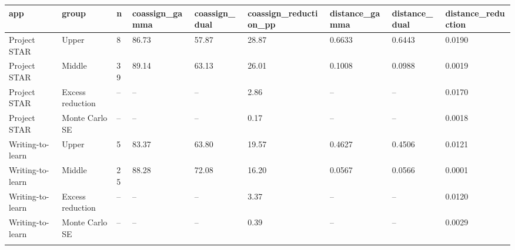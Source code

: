 \begin{longtable}{lllllllll}
\toprule
app & group & n & coassign\_gamma & coassign\_dual & coassign\_reduction\_pp & distance\_gamma & distance\_dual & distance\_reduction \\
\midrule\endhead
Project STAR & Upper & 8 & 86.73 & 57.87 & 28.87 & 0.6633 & 0.6443 & 0.0190 \\ \addlinespace[3pt]
Project STAR & Middle & 39 & 89.14 & 63.13 & 26.01 & 0.1008 & 0.0988 & 0.0019 \\ \addlinespace[3pt]
Project STAR & Excess reduction & -- & -- & -- & 2.86 & -- & -- & 0.0170 \\ \addlinespace[3pt]
Project STAR & Monte Carlo SE & -- & -- & -- & 0.17 & -- & -- & 0.0018 \\ \addlinespace[3pt]
Writing-to-learn & Upper & 5 & 83.37 & 63.80 & 19.57 & 0.4627 & 0.4506 & 0.0121 \\ \addlinespace[3pt]
Writing-to-learn & Middle & 25 & 88.28 & 72.08 & 16.20 & 0.0567 & 0.0566 & 0.0001 \\ \addlinespace[3pt]
Writing-to-learn & Excess reduction & -- & -- & -- & 3.37 & -- & -- & 0.0120 \\ \addlinespace[3pt]
Writing-to-learn & Monte Carlo SE & -- & -- & -- & 0.39 & -- & -- & 0.0029 \\ \addlinespace[3pt]
\bottomrule\end{longtable}
